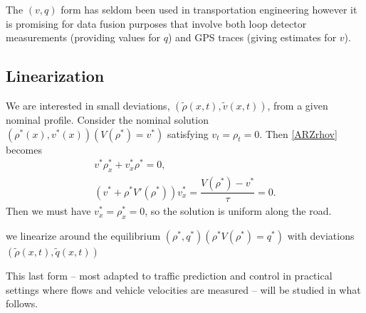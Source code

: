 \documentclass[a4paper, 10pt, conference]{ieeeconf}      %
\begin{document}

The $\left(v, q \right)$ form has seldom been used in transportation engineering however it is promising for data fusion purposes that involve both loop detector measurements (providing values for $q$) and GPS traces (giving estimates for $v$).


\subsection{Linearization}
We are interested in small deviations, $(\tilde{\rho}(x,t), \tilde{v}(x,t))$, from a given nominal profile. Consider the nominal solution $(\rho^*(x),v^*(x))(V(\rho^*) = v^*)$ satisfying $v_t = \rho_t = 0$. Then \eqref{ARZrhov} becomes
\begin{align}
v^* \rho^*_x + v^*_x\rho^* = 0, \\
( v^* + \rho^* V'( \rho^*) )v^*_x = \dfrac{V(\rho^*) - v^*}{\tau} = 0.
\end{align}
Then we must have $v^*_x=\rho^*_x=0$, so the solution is uniform along the road. 

we linearize around the equilibrium $(\rho^*, q^*)(\rho^*V(\rho^*) = q^*)$ with deviations $(\tilde{\rho}(x,t), \tilde{q}(x,t))$

This last form -- most adapted to traffic prediction and control in practical settings where flows and vehicle velocities are measured -- will be studied in what follows.
\end{document}
